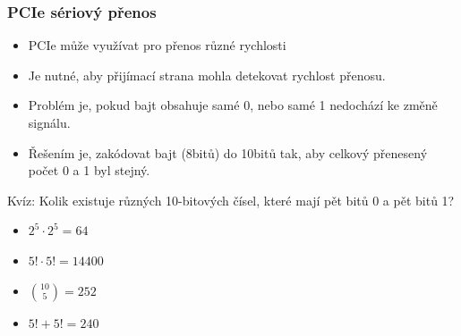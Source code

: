 \documentclass{beamer}
\begin{document}
\begin{frame}
\frametitle{PCIe sériový přenos}

\begin{itemize}
\item PCIe může využívat pro přenos různé rychlosti
\item Je nutné, aby přijímací strana mohla detekovat rychlost přenosu.
\item Problém je, pokud bajt obsahuje samé 0, nebo samé 1 nedochází ke změně signálu.
\item Řešením je, zakódovat bajt (8bitů) do 10bitů tak, aby celkový přenesený počet 0 a 1 byl stejný.
\end{itemize}

Kvíz: Kolik existuje různých 10-bitových čísel, které mají pět bitů 0 a pět bitů 1?
\begin{itemize}
\item[A] $2^5 \cdot 2^5 = 64$
\item[B] $5! \cdot 5! = 14400$
\item[C] ${10 \choose 5} = 252$
\item[D] $5! + 5! = 240$
\end{itemize}
\end{frame}
\end{document}
